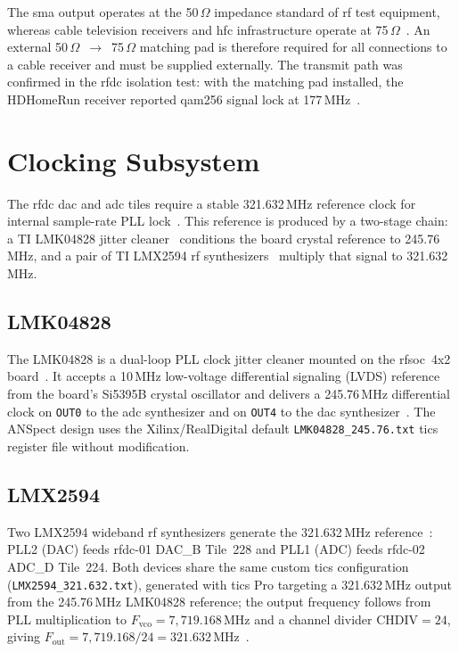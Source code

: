 The \ac{sma} output operates at the 50\,$\Omega$ impedance standard
of \ac{rf} test equipment, whereas cable television receivers and
\ac{hfc} infrastructure operate at 75\,$\Omega$~\cite{SCTE07}.
An external 50\,$\Omega$~$\to$~75\,$\Omega$ matching pad is
therefore required for all connections to a cable receiver and must
be supplied externally.
The transmit path was confirmed in the \ac{rfdc} isolation test: 
with the matching pad installed, the HDHomeRun
receiver reported \ac{qam256} signal lock at
177\,MHz~\cite{RealDigital_A6}.

\clearpage

\section{Clocking Subsystem}
\label{sec:clocking}

The \ac{rfdc} \ac{dac} and \ac{adc} tiles require a stable 321.632\,MHz
reference clock for internal sample-rate \ac{PLL} lock~\cite{AMD_PG269}.
This reference is produced by a two-stage chain: a TI LMK04828 jitter
cleaner~\cite{TI_LMK04828} conditions the board crystal reference to
245.76\,MHz, and a pair of TI LMX2594 \ac{rf} synthesizers~\cite{TI_LMX2594}
multiply that signal to 321.632\,MHz.

\subsection{LMK04828}
\label{subsec:lmk04828}

The LMK04828 is a dual-loop \ac{PLL} clock jitter cleaner mounted on the
\ac{rfsoc}~4x2 board~\cite{RealDigital_A6}.
It accepts a 10\,MHz low-voltage differential signaling (LVDS) 
reference from the board's Si5395B crystal
oscillator and delivers a 245.76\,MHz differential clock on \texttt{OUT0}
to the \ac{adc} synthesizer and on \texttt{OUT4} to the \ac{dac}
synthesizer~\cite{TI_LMK04828}.
The ANSpect design uses the Xilinx/RealDigital default
\texttt{LMK04828\_245.76.txt} \ac{tics} register file without modification.

\subsection{LMX2594}
\label{subsec:lmx2594}

Two LMX2594 wideband \ac{rf} synthesizers generate the 321.632\,MHz
reference~\cite{TI_LMX2594}: PLL2 (DAC) feeds \ac{rfdc}-01 DAC\_B
Tile~228 and PLL1 (ADC) feeds \ac{rfdc}-02 ADC\_D Tile~224.
Both devices share the same custom \ac{tics} configuration
(\texttt{LMX2594\_321.632.txt}), generated with \ac{tics} Pro targeting
a 321.632\,MHz output from the 245.76\,MHz LMK04828 reference;
the output frequency follows from \ac{PLL} multiplication to
$F_\text{vco} = 7{,}719.168$\,MHz and a channel divider
$\text{CHDIV} = 24$, giving
$F_\text{out} = 7{,}719.168 / 24 = 321.632$\,MHz~\cite{TI_LMX2594}.

